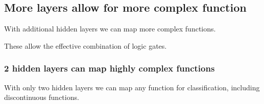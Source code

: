 
\subsection{More layers allow for more complex function}

With additional hidden layers we can map more complex functions.

These allow the effective combination of logic gates.

\subsubsection{2 hidden layers can map highly complex functions}

With only two hidden layers we can map any function for classification, including discontinuous functions.

